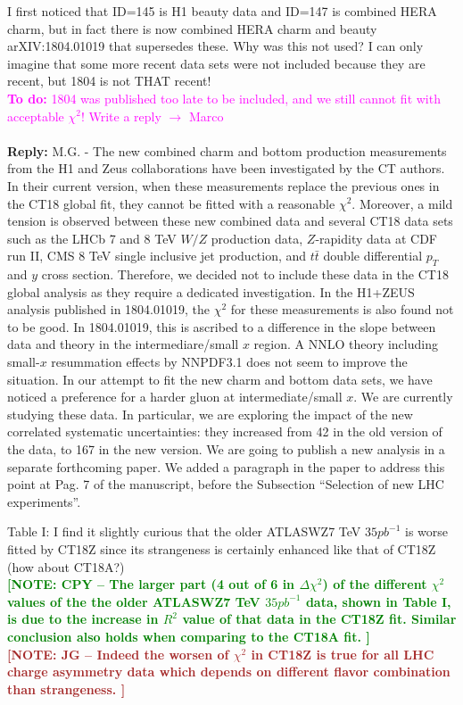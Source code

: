 \documentclass[aps,prd,amsmath,nofootinbib,floatfix,fleqn]{revtex4}
\newcommand{\TODO}[1]{\textcolor{magenta}{
\quad\vspace{3pt} \\ {\bf To do:} #1 \\
}}
\newcommand{\REPLY}[1]{\textcolor{redish}{\quad \\
{\bf Reply:} #1 \\
}}
\newcommand{\NOTECPY}[1]{\textcolor{green}{ \bf[NOTE: CPY -- #1 ]}}
\newcommand{\NOTEJG}[1]{\textcolor{brown}{ \bf[NOTE: JG -- #1 ]}}
\begin{document}
I first noticed that ID=145 is H1 beauty data and ID=147 is combined HERA charm, but in fact there is now combined HERA charm and beauty arXIV:1804.01019 that supersedes these. Why was this not used? I can only imagine that some more recent data sets were not included because they are recent, but 1804 is not THAT recent!
\TODO{1804 was published too late to be included, and we still cannot fit with acceptable $\chi^2$! Write a reply $\to$ Marco}
\REPLY{M.G. - The new combined charm and bottom production measurements from the H1 and Zeus collaborations have been investigated by the CT authors.
In their current version, when these measurements replace the previous ones in the CT18 global fit, they cannot be fitted with a reasonable $\chi^2$.
Moreover, a mild tension is observed between these new combined data and several CT18 data sets such as the LHCb 7 and 8 TeV $W/Z$ production data, $Z$-rapidity data at CDF run II,
CMS 8 TeV single inclusive jet production, and $t\bar{t}$ double differential $p_T$ and $y$ cross section. Therefore, we decided not to include these data in the CT18 global analysis
as they require a dedicated investigation.
In the H1+ZEUS analysis published in 1804.01019, the $\chi^2$ for these measurements is also found not to be good. In 1804.01019, this is ascribed to a difference
in the slope between data and theory in the intermediare/small $x$ region. A NNLO theory including small-$x$ resummation effects by NNPDF3.1 does not seem to improve the situation.
In our attempt to fit the new charm and bottom data sets, we have noticed a preference for a harder gluon at intermediate/small $x$.
We are currently studying these data. In particular, we are exploring the impact of the new correlated systematic uncertainties: they increased from 42 in the old version of the data, to 167 in the new version.
We are going to publish a new analysis in a separate forthcoming paper.
We added a paragraph in the paper to address this point at Pag. 7 of the manuscript, before the Subsection ``Selection of new LHC experiments''.}



\noindent
Table I:  I find it slightly curious that the older ATLASWZ7 TeV $35pb^{-1}$ is worse fitted by CT18Z since its strangeness is certainly enhanced like that of CT18Z (how about CT18A?)\\
\NOTECPY{The larger part (4 out of 6 in $\Delta \chi^2$) of the different $\chi^2$ values of the the older ATLASWZ7 TeV $35pb^{-1}$ data, shown in Table I, is due to the increase in $R^2$ value of that data in the CT18Z fit. Similar conclusion also holds when comparing to the CT18A fit.}\\
\NOTEJG{Indeed the worsen of $\chi^2$ in CT18Z is true for all LHC charge asymmetry data which depends on different flavor combination than strangeness.}\\
\end{document}

